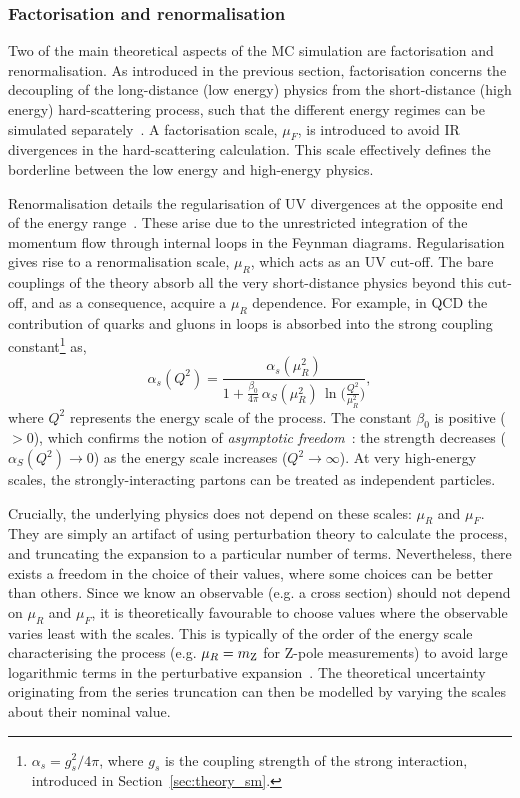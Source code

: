 \subsubsection{Factorisation and renormalisation}
Two of the main theoretical aspects of the MC simulation are factorisation and renormalisation. As introduced in the previous section, factorisation concerns the decoupling of the long-distance (low energy) physics from the short-distance (high energy) hard-scattering process, such that the different energy regimes can be simulated separately~\cite{doi:10.1146_annurev.nucl.55.090704.151505}. A factorisation scale, $\mu_F$, is introduced to avoid IR divergences in the hard-scattering calculation. This scale effectively defines the borderline between the low energy and high-energy physics.

Renormalisation details the regularisation of UV divergences at the opposite end of the energy range~\cite{Brock:1993sz}. These arise due to the unrestricted integration of the momentum flow through internal loops in the Feynman diagrams. Regularisation gives rise to a renormalisation scale, $\mu_R$, which acts as an UV cut-off. The bare couplings of the theory absorb all the very short-distance physics beyond this cut-off, and as a consequence, acquire a $\mu_R$ dependence. For example, in QCD the contribution of quarks and gluons in loops is absorbed into the strong coupling constant\footnote{$\alpha_s=g^2_s/4\pi$, where $g_s$ is the coupling strength of the strong interaction, introduced in Section~\ref{sec:theory_sm}.} as,
\begin{equation}
    \alpha_s(Q^2) = \frac{\alpha_s(\mu_R^2)}{1+\frac{\beta_0}{4\pi}\,\alpha_S(\mu_R^2)\,\ln\Big(\frac{Q^2}{\mu_R^2}\Big)},
\end{equation}
\noindent
where $Q^2$ represents the energy scale of the process. The constant $\beta_0$ is positive (${>0}$), which confirms the notion of \textit{asymptotic freedom}~\cite{PhysRevLett.30.1343}: the strength decreases ($\alpha_S(Q^2) \rightarrow 0$) as the energy scale increases ($Q^2\rightarrow\infty$). At very high-energy scales, the strongly-interacting partons can be treated as independent particles. 

Crucially, the underlying physics does not depend on these scales: $\mu_R$ and $\mu_F$. They are simply an artifact of using perturbation theory to calculate the process, and truncating the expansion to a particular number of terms. Nevertheless, there exists a freedom in the choice of their values, where some choices can be better than others. Since we know an observable (e.g. a cross section) should not depend on $\mu_R$ and $\mu_F$, it is theoretically favourable to choose values where the observable varies least with the scales. This is typically of the order of the energy scale characterising the process (e.g. $\mu_R = m_{\rm{Z}}$ for Z-pole measurements) to avoid large logarithmic terms in the perturbative expansion~\cite{Buckley:2011ms}. The theoretical uncertainty originating from the series truncation can then be modelled by varying the scales about their nominal value.

